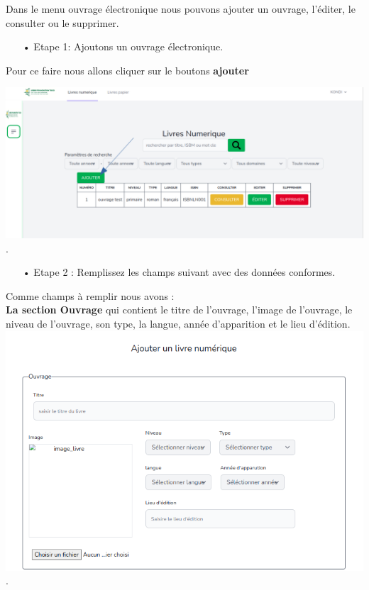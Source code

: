 \documentclass[12pt,a4paper]{article}
\begin{document}
Dans le menu ouvrage électronique nous pouvons ajouter un ouvrage, l'éditer, le consulter ou le supprimer.

\begin{itemize}
\item[•]Etape 1: Ajoutons un ouvrage électronique.
\end{itemize}

Pour ce faire nous allons cliquer sur le boutons \textbf{ajouter} 

\includegraphics[scale=0.5]{images/BoutonsAjout.png}. \\

\begin{itemize}
\item[•]Etape 2 : Remplissez les champs suivant avec des données conformes.
\end{itemize}

Comme champs à remplir nous avons :\\
\textbf{La section Ouvrage} qui contient le titre de l'ouvrage, l'image de l'ouvrage, le niveau de l'ouvrage, son type, la langue, année d'apparition et le lieu d’édition.\\
\includegraphics[scale=0.5]{images/Ajoutuvragelectro.png}.\\
\newpage
\end{document}
